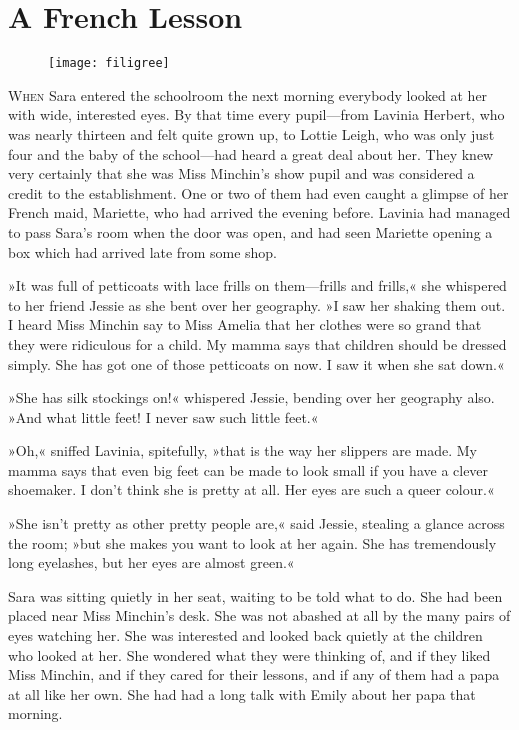 \chapter{A French Lesson}

\begin{figure}[t!]
\centering
\texttt{[image: filigree]}
\end{figure}

\lettrine[lines=5]{W}{hen} Sara entered the schoolroom the next morning everybody looked at her with wide, interested eyes. By that time every pupil—from Lavinia Herbert, who was nearly thirteen and felt quite grown up, to Lottie Leigh, who was only just four and the baby of the school—had heard a great deal about her. They knew very certainly that she was Miss Minchin's show pupil and was considered a credit to the establishment. One or two of them had even caught a glimpse of her French maid, Mariette, who had arrived the evening before. Lavinia had managed to pass Sara's room when the door was open, and had seen Mariette opening a box which had arrived late from some shop.

»It was full of petticoats with lace frills on them—frills and frills,« she whispered to her friend Jessie as she bent over her geography. »I saw her shaking them out. I heard Miss Minchin say to Miss Amelia that her clothes were so grand that they were ridiculous for a child. My mamma says that children should be dressed simply. She has got one of those petticoats on now. I saw it when she sat down.«

»She has silk stockings on!« whispered Jessie, bending over her geography also. »And what little feet! I never saw such little feet.«

»Oh,« sniffed Lavinia, spitefully, »that is the way her slippers are made. My mamma says that even big feet can be made to look small if you have a clever shoemaker. I don't think she is pretty at all. Her eyes are such a queer colour.«

»She isn't pretty as other pretty people are,« said Jessie, stealing a glance across the room; »but she makes you want to look at her again. She has tremendously long eyelashes, but her eyes are almost green.«

Sara was sitting quietly in her seat, waiting to be told what to do. She had been placed near Miss Minchin's desk. She was not abashed at all by the many pairs of eyes watching her. She was interested and looked back quietly at the children who looked at her. She wondered what they were thinking of, and if they liked Miss Minchin, and if they cared for their lessons, and if any of them had a papa at all like her own. She had had a long talk with Emily about her papa that morning.

